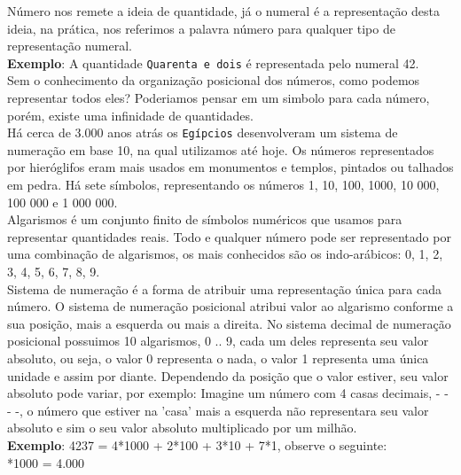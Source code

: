\documentclass[12pt, onecolumn]{article}
\begin{document}
	Número nos remete a ideia de quantidade, já o numeral é a 
	representação desta ideia, na prática, nos referimos a palavra 
	número para qualquer tipo de representação numeral. \\
	\newline
	\textbf{Exemplo}: A quantidade \texttt{Quarenta e dois} é representada pelo
	numeral 42.\\
	\newline
	Sem o conhecimento da organização posicional dos números, como podemos
	representar todos eles? Poderiamos pensar em um simbolo para cada número,
	porém, existe uma infinidade de quantidades.\\
	\newline
	Há cerca de 3.000 anos atrás os \texttt{Egípcios} desenvolveram um sistema
	de numeração em base 10, na qual utilizamos até hoje. 
	Os números representados por hieróglifos eram mais usados em 
	monumentos e templos, pintados ou talhados em pedra. Há sete símbolos, 
	representando os números 1, 10, 100, 1000, 10 000, 100 000 e 
	1 000 000. \\
	\newline
	Algarismos é um conjunto finito de símbolos numéricos que usamos para
	representar quantidades reais. Todo e qualquer número pode ser representado
	por uma combinação de algarismos, os mais conhecidos são os indo-arábicos:
	0, 1, 2, 3, 4, 5, 6, 7, 8, 9. \\
	\newline
	Sistema de numeração é a forma de atribuir uma representação única para 
	cada número. O sistema de numeração posicional atribui valor 
	ao algarismo conforme a sua posição, mais a esquerda ou mais a direita.
	\newline
	No sistema decimal de numeração posicional possuimos 10 algarismos, 0 .. 9,
	cada um deles representa seu valor absoluto, ou seja, o valor 0 
	representa o nada, o valor 1 representa uma única unidade 
	e assim por diante. Dependendo da posição que o valor estiver, 
	seu valor absoluto pode variar, por exemplo: Imagine um número com 
	4 casas decimais, - - - -, o número que estiver na 'casa' mais a esquerda 
	não representara seu valor absoluto e sim o seu valor
	absoluto multiplicado por um milhão. \\
	\newline
	\textbf{Exemplo}: 4237 = 4*1000 + 2*100 + 3*10 + 7*1, observe o seguinte:\\
	*1000 	= 4.000\\
\end{document}
